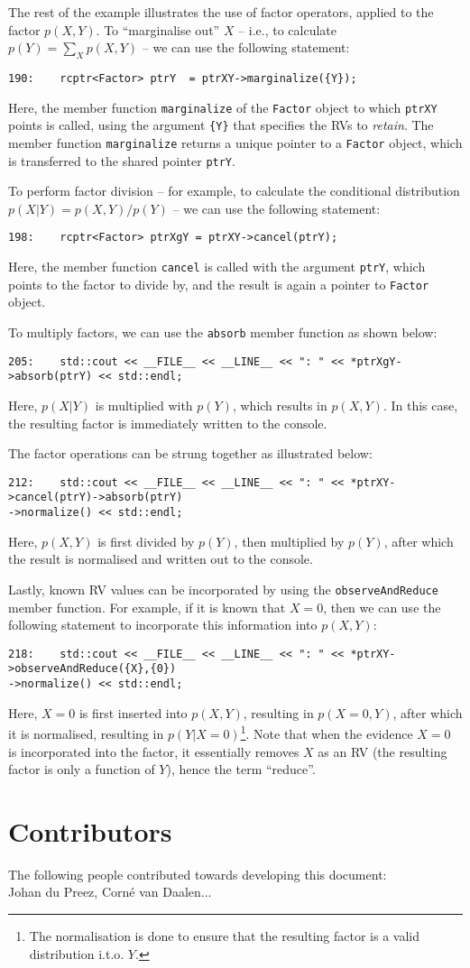 \documentclass[english]{article}
\begin{document}
The rest of the example illustrates the use of factor operators,
applied to the factor $p(X,Y)$.  To ``marginalise out'' $X$ -- i.e.,
to calculate $p(Y) = \sum_Xp(X,Y)$ -- we can use the following
statement:
\begin{verbatim}
190:    rcptr<Factor> ptrY  = ptrXY->marginalize({Y});
\end{verbatim}
Here, the member function \texttt{marginalize} of the \texttt{Factor}
object to which \texttt{ptrXY} points is called, using the argument
\texttt{\{Y\}} that specifies the RVs to \emph{retain}.  The member
function \texttt{marginalize} returns a unique pointer to a
\texttt{Factor} object, which is transferred to the shared pointer
\texttt{ptrY}.

To perform factor division -- for example, to calculate the
conditional distribution $p(X|Y) = p(X,Y)/p(Y)$ -- we can use the
following statement:
\begin{verbatim}
198:    rcptr<Factor> ptrXgY = ptrXY->cancel(ptrY);
\end{verbatim}
Here, the member function \texttt{cancel} is called with the argument
\texttt{ptrY}, which points to the factor to divide by, and the result
is again a pointer to \texttt{Factor} object.

To multiply factors, we can use the \texttt{absorb} member function as
shown below:
\begin{verbatim}
205:    std::cout << __FILE__ << __LINE__ << ": " << *ptrXgY->absorb(ptrY) << std::endl;
\end{verbatim}
Here, $p(X|Y)$ is multiplied with $p(Y)$, which results in $p(X,Y)$.
In this case, the resulting factor is immediately written to the
console.

The factor operations can be strung together as illustrated below:
\begin{verbatim}
212:    std::cout << __FILE__ << __LINE__ << ": " << *ptrXY->cancel(ptrY)->absorb(ptrY)
->normalize() << std::endl;
\end{verbatim}
Here, $p(X,Y)$ is first divided by $p(Y)$, then multiplied by $p(Y)$,
after which the result is normalised and written out to the console.

Lastly, known RV values can be incorporated by using the
\texttt{observeAndReduce} member function.  For example, if it is
known that $X=0$, then we can use the following statement to
incorporate this information into $p(X,Y)$:
\begin{verbatim}
218:    std::cout << __FILE__ << __LINE__ << ": " << *ptrXY->observeAndReduce({X},{0})
->normalize() << std::endl;
\end{verbatim}
Here, $X=0$ is first inserted into $p(X,Y)$, resulting in $p(X=0,Y)$,
after which it is normalised, resulting in $p(Y|X=0)$\footnote{The
normalisation is done to ensure that the resulting factor is a valid
distribution i.t.o. $Y$.}.  Note that when the evidence $X=0$ is
incorporated into the factor, it essentially removes $X$ as an RV (the
resulting factor is only a function of $Y$), hence the term
``reduce''.


\section*{Contributors}
The following people contributed towards developing this document:\\
Johan du Preez, Corn\'e van Daalen...
\end{document}

